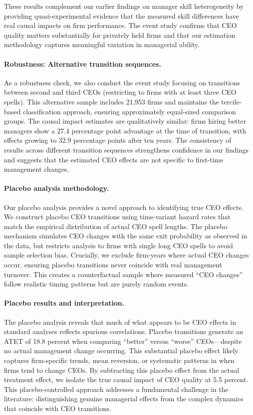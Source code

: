 \documentclass[11pt,a4paper]{article}
\begin{document}
These results complement our earlier findings on manager skill heterogeneity by providing quasi-experimental evidence that the measured skill differences have real causal impacts on firm performance. The event study confirms that CEO quality matters substantially for privately held firms and that our estimation methodology captures meaningful variation in managerial ability.

\paragraph{Robustness: Alternative transition sequences.} As a robustness check, we also conduct the event study focusing on transitions between second and third CEOs (restricting to firms with at least three CEO spells). This alternative sample includes 21,953 firms and maintains the tercile-based classification approach, ensuring approximately equal-sized comparison groups. The causal impact estimates are qualitatively similar: firms hiring better managers show a 27.4 percentage point advantage at the time of transition, with effects growing to 32.9 percentage points after ten years. The consistency of results across different transition sequences strengthens confidence in our findings and suggests that the estimated CEO effects are not specific to first-time management changes.

\paragraph{Placebo analysis methodology.} Our placebo analysis provides a novel approach to identifying true CEO effects. We construct placebo CEO transitions using time-variant hazard rates that match the empirical distribution of actual CEO spell lengths. The placebo mechanism simulates CEO changes with the same exit probability as observed in the data, but restricts analysis to firms with single long CEO spells to avoid sample selection bias. Crucially, we exclude firm-years where actual CEO changes occur, ensuring placebo transitions never coincide with real management turnover. This creates a counterfactual sample where measured ``CEO changes'' follow realistic timing patterns but are purely random events.

\paragraph{Placebo results and interpretation.} The placebo analysis reveals that much of what appears to be CEO effects in standard analyses reflects spurious correlations. Placebo transitions generate an ATET of 18.8 percent when comparing ``better'' versus ``worse'' CEOs---despite no actual management change occurring. This substantial placebo effect likely captures firm-specific trends, mean reversion, or systematic patterns in when firms tend to change CEOs. By subtracting this placebo effect from the actual treatment effect, we isolate the true causal impact of CEO quality at 5.5 percent. This placebo-controlled approach addresses a fundamental challenge in the literature: distinguishing genuine managerial effects from the complex dynamics that coincide with CEO transitions. 
\end{document}
